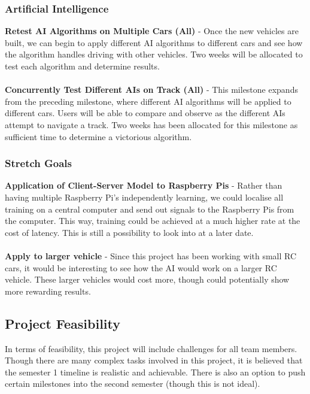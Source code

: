 \documentclass[8pt]{article}
\begin{document}
\newpage

%
%
%
\subsubsection{Artificial Intelligence}
\textbf{Retest AI Algorithms on Multiple Cars (All)} - Once the new vehicles are built, we can begin to apply different AI algorithms to different cars and see how the algorithm handles driving with other vehicles. Two weeks will be allocated to test each algorithm and determine results.
\\\\
\textbf{Concurrently Test Different AIs on Track (All)} - This milestone expands from the preceding milestone, where different AI algorithms will be applied to different cars. Users will be able to compare and observe as the different AIs attempt to navigate a track. Two weeks has been allocated for this milestone as sufficient time to determine a victorious algorithm.

\subsubsection{Stretch Goals}
\textbf{Application of Client-Server Model to Raspberry Pis} - Rather than having multiple Raspberry Pi’s independently learning, we could localise all training on a central computer and send out signals to the Raspberry Pis from the computer. This way, training could be achieved at a much higher rate at the cost of latency. This is still a possibility to look into at a later date.
\\\\
\textbf{Apply to larger vehicle} - Since this project has been working with small RC cars, it would be interesting to see how the AI would work on a larger RC vehicle. These larger vehicles would cost more, though could potentially show more rewarding results. 


\subsection{Project Feasibility}
In terms of feasibility, this project will include challenges for all team members. Though there are many complex tasks involved in this project, it is believed that the semester 1 timeline  is realistic and achievable. There is also an option to push certain milestones into the second semester (though this is not ideal).
\end{document}
